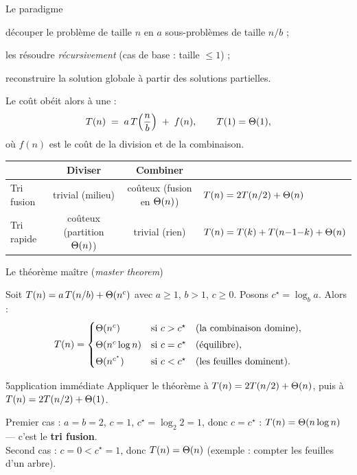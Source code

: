 \documentclass[11pt,aspectratio=169]{beamer}
\begin{document}
\begin{frame}[shrink=15]{Le paradigme}
\begin{encadre}[title=Diviser pour régner (\emph{divide and conquer}),fonttitle=\bfseries]
\begin{description}[leftmargin=1.7cm,style=nextline,itemsep=1pt]
  \item[Diviser] découper le problème de taille $n$ en $a$ sous-problèmes de taille $n/b$ ;
  \item[Régner] les résoudre \emph{récursivement} (cas de base : taille $\le 1$) ;
  \item[Combiner] reconstruire la solution globale à partir des solutions partielles.
\end{description}
\end{encadre}
\vspace{4pt}
Le coût obéit alors à une  :
\[
T(n)\;=\;a\,T\!\left(\frac nb\right)\;+\;f(n),\qquad T(1)=\Theta(1),
\]
où $f(n)$ est le coût de la division et de la combinaison.
\vspace{4pt}
\begin{center}\small
\begin{tabular}{lccl}
\toprule
& \textbf{Diviser} & \textbf{Combiner} & \\
\midrule
Tri fusion & trivial (milieu) & coûteux (fusion en $\Theta(n)$) & $T(n)=2T(n/2)+\Theta(n)$\\
Tri rapide & coûteux (partition $\Theta(n)$) & trivial (rien) & $T(n)=T(k)+T(n{-}1{-}k)+\Theta(n)$\\
\bottomrule
\end{tabular}
\end{center}
\centering\footnotesize{}
\end{frame}

\begin{frame}{Le théorème maître (\emph{master theorem})}
\begin{encadre}
Soit $T(n)=a\,T(n/b)+\Theta(n^c)$ avec $a\ge1$, $b>1$, $c\ge0$. Posons
$c^\star=\log_b a$. Alors :
\[
T(n)=
\begin{cases}
\Theta(n^{c}) & \text{si } c>c^\star \quad(\text{la combinaison domine}),\\[3pt]
\Theta(n^{c}\log n) & \text{si } c=c^\star \quad(\text{équilibre}),\\[3pt]
\Theta(n^{c^\star}) & \text{si } c<c^\star \quad(\text{les feuilles dominent}).
\end{cases}
\]
\end{encadre}
\vspace{4pt}
\begin{exercice}{5}{application immédiate}
Appliquer le théorème à $T(n)=2T(n/2)+\Theta(n)$, puis à $T(n)=2T(n/2)+\Theta(1)$.
\end{exercice}
\pause
\begin{soluce}\small
Premier cas : $a=b=2$, $c=1$, $c^\star=\log_2 2=1$, donc $c=c^\star$ :
$T(n)=\Theta(n\log n)$ --- c'est le \textbf{tri fusion}.\\
Second cas : $c=0<c^\star=1$, donc $T(n)=\Theta(n)$ (exemple : compter les feuilles d'un arbre).
\end{soluce}
\end{frame}
\end{document}
